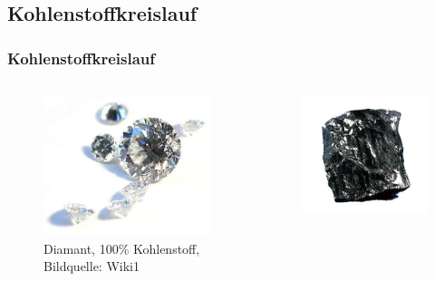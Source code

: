 \subsection{Kohlenstoffkreislauf}

\begin{frame}
	\frametitle{Kohlenstoffkreislauf}
	\begin{columns}
		\begin{figure}
			\centering
			\includegraphics[width=\linewidth]{bilder/kohlenstoff/Brillanten}
			\caption{Diamant, 100\% Kohlenstoff, Bildquelle: Wiki1}
		\end{figure}
		\begin{figure}
			\centering
			\includegraphics[width=\linewidth]{bilder/kohlenstoff/kohle}

\end{figure}
\end{columns}
\end{frame}
